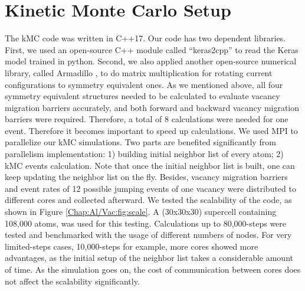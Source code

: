 \section{Kinetic Monte Carlo Setup}
\label{Chap:Al/Vac:section:KMC}


The \ac{kMC} code was written in C++17\cite{Zhang2020KNN2}. Our code has two dependent libraries. First, we used an open-source C++ module called ``keras2cpp'' to read the Keras model trained in python\cite{Perevozchikov2019}. Second, we also applied another open-source numerical library, called Armadillo \cite{sanderson2016armadillo, sanderson2018user}, to do matrix multiplication for rotating current configurations to symmetry equivalent ones. As we mentioned above, all four symmetry equivalent structures needed to be calculated to evaluate vacancy migration barriers accurately, and both forward and backward vacancy migration barriers were required. Therefore, a total of 8 calculations were needed for one event. Therefore it becomes important to speed up calculations. We used \ac{MPI} to parallelize our \ac{kMC} simulations. Two parts are benefited significantly from parallelism implementation: 1) building initial neighbor list of every atom; 2) \ac{kMC} events calculation. Note that once the initial neighbor list is built, one can keep updating the neighbor list on the fly. Besides, vacancy migration barriers and event rates of 12 possible jumping events of one vacancy were distributed to different cores and collected afterward. We tested the scalability of the code, as shown in Figure \ref{Chap:Al/Vac:fig:scale}. A (30x30x30) supercell containing 108,000 atoms, was used for this testing. Calculations up to 80,000-steps were tested and benchmarked with the usage of different numbers of nodes. For very limited-steps cases, 10,000-steps for example, more cores showed more advantages, as the initial setup of the neighbor list takes a considerable amount of time. As the simulation goes on, the cost of communication between cores does not affect the scalability significantly.


